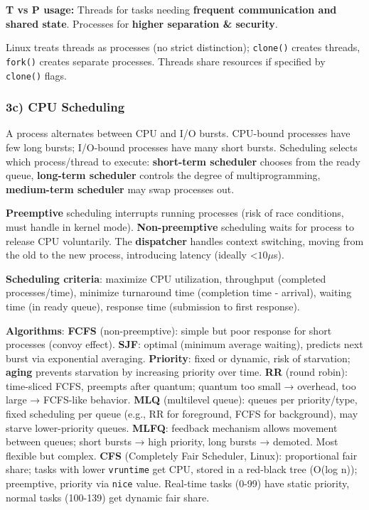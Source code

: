 \textbf{T vs P usage: }Threads for tasks needing \textbf{frequent communication and shared state}.
Processes for \textbf{higher separation \& security}.

Linux treats threads as processes (no strict distinction); \texttt{clone()} creates threads, \texttt{fork()} creates separate processes. Threads share resources if specified by \texttt{clone()} flags.


\subsubsection*{3c) CPU Scheduling}

A process alternates between CPU and I/O bursts. CPU-bound processes have few long bursts; I/O-bound processes have many short bursts. Scheduling selects which process/thread to execute: \textbf{short-term scheduler} chooses from the ready queue, \textbf{long-term scheduler} controls the degree of multiprogramming, \textbf{medium-term scheduler} may swap processes out.

\textbf{Preemptive} scheduling interrupts running processes (risk of race conditions, must handle in kernel mode). \textbf{Non-preemptive} scheduling waits for process to release CPU voluntarily. The \textbf{dispatcher} handles context switching, moving from the old to the new process, introducing latency (ideally <$10\mu$s).

\textbf{Scheduling criteria}: maximize CPU utilization, throughput (completed processes/time), minimize turnaround time (completion time - arrival), waiting time (in ready queue), response time (submission to first response).

\textbf{Algorithms}:
\textbf{FCFS} (non-preemptive): simple but poor response for short processes (convoy effect).
\textbf{SJF}: optimal (minimum average waiting), predicts next burst via exponential averaging.
\textbf{Priority}: fixed or dynamic, risk of starvation; \textbf{aging} prevents starvation by increasing priority over time.  
\textbf{RR} (round robin): time-sliced FCFS, preempts after quantum; quantum too small → overhead, too large → FCFS-like behavior.  
\textbf{MLQ} (multilevel queue): queues per priority/type, fixed scheduling per queue (e.g., RR for foreground, FCFS for background), may starve lower-priority queues.
\textbf{MLFQ}: feedback mechanism allows movement between queues; short bursts → high priority, long bursts → demoted. Most flexible but complex.
\textbf{CFS} (Completely Fair Scheduler, Linux): proportional fair share; tasks with lower \texttt{vruntime} get CPU, stored in a red-black tree (O(log n)); preemptive, priority via \texttt{nice} value. Real-time tasks (0-99) have static priority, normal tasks (100-139) get dynamic fair share.

